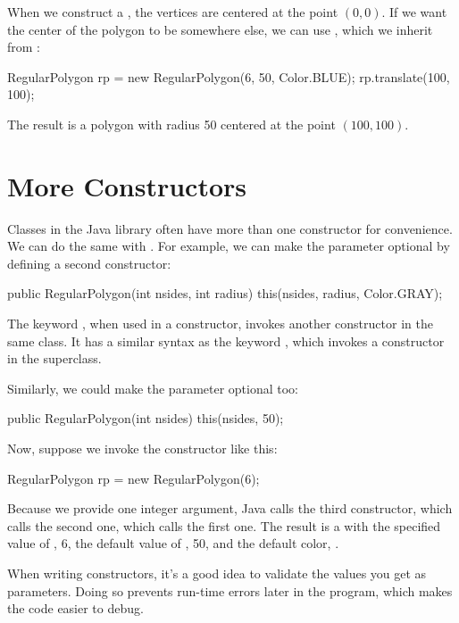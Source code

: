 When we construct a , the vertices are centered at the point $(0, 0)$.
If we want the center of the polygon to be somewhere else, we can use , which we inherit from :

\begin{code}
RegularPolygon rp = new RegularPolygon(6, 50, Color.BLUE);
rp.translate(100, 100);
\end{code}

The result is a polygon with radius 50 centered at the point $(100, 100)$.


\section{More Constructors}

Classes in the Java library often have more than one constructor for convenience.
We can do the same with .
For example, we can make the  parameter optional by defining a second constructor:

\begin{code}
public RegularPolygon(int nsides, int radius) {
    this(nsides, radius, Color.GRAY);
}
\end{code}

The keyword , when used in a constructor, invokes another constructor in the same class.
It has a similar syntax as the keyword , which invokes a constructor in the superclass.

Similarly, we could make the  parameter optional too:

\begin{code}
public RegularPolygon(int nsides) {
    this(nsides, 50);
}
\end{code}

Now, suppose we invoke the  constructor like this:

\begin{code}
RegularPolygon rp = new RegularPolygon(6);
\end{code}

Because we provide one integer argument, Java calls the third constructor, which calls the second one, which calls the first one.
The result is a  with the specified value of , 6, the default value of , 50, and the default color, .

When writing constructors, it's a good idea to validate the values you get as parameters.
Doing so prevents run-time errors later in the program, which makes the code easier to debug.

